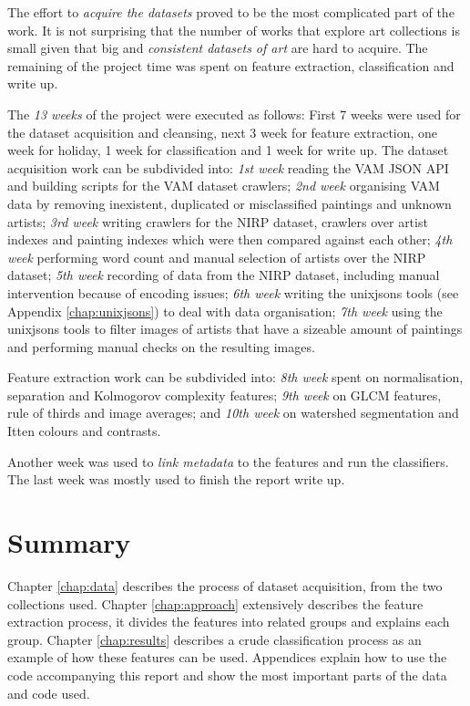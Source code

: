 \documentclass[11pt,a4paper,twoside,openright]{report}
\begin{document}
The effort to \emph{acquire the datasets} proved to be the most complicated
part of the work.  It is not surprising that the number of works that explore
art collections is small given that big and \emph{consistent datasets of art}
are hard to acquire.  The remaining of the project time was spent on feature
extraction, classification and write up.

The \emph{13 weeks} of the project were executed as follows: First 7 weeks were
used for the dataset acquisition and cleansing, next 3 week for feature
extraction, one week for holiday, 1 week for classification and 1 week for
write up.  The dataset acquisition work can be subdivided into: \emph{1st week}
reading the VAM JSON API and building scripts for the VAM dataset crawlers;
\emph{2nd week} organising VAM data by removing inexistent, duplicated or
misclassified paintings and unknown artists;  \emph{3rd week} writing crawlers
for the NIRP dataset, crawlers over artist indexes and painting indexes which
were then compared against each other;  \emph{4th week} performing word count
and manual selection of artists over the NIRP dataset;  \emph{5th week}
recording of data from the NIRP dataset, including manual intervention because
of encoding issues;  \emph{6th week} writing the unixjsons tools (see Appendix
\ref{chap:unixjsons}) to deal with data organisation;  \emph{7th week} using
the unixjsons tools to filter images of artists that have a sizeable amount of
paintings and performing manual checks on the resulting images.

Feature extraction work can be subdivided into: \emph{8th week} spent on
normalisation, separation and Kolmogorov complexity features;  \emph{9th week}
on GLCM features, rule of thirds and image averages; and \emph{10th week} on
watershed segmentation and Itten colours and contrasts.

Another week was used to \emph{link metadata} to the features and run the
classifiers.  The last week was mostly used to finish the report write up.

\section{Summary}

Chapter \ref{chap:data} describes the process of dataset acquisition, from the
two collections used.  Chapter \ref{chap:approach} extensively describes the
feature extraction process, it divides the features into related groups and
explains each group.  Chapter \ref{chap:results} describes a crude
classification process as an example of how these features can be used.
Appendices explain how to use the code accompanying this report and show the
most important parts of the data and code used.
\end{document}
